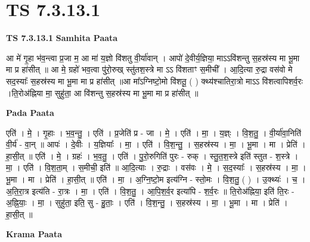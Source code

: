\documentclass[17pt]{extarticle}
\begin{document}
\section{ TS 7.3.13.1 }

\textbf{TS 7.3.13.1 } \newline
\textbf{Samhita Paata} \newline

आ मे॑ गृ॒हा भ॑व॒न्त्वा प्र॒जा म॒ आ मा॑ य॒ज्ञो वि॑शतु वी॒र्या॑वान् । आपो॑ दे॒वीर्य॒ज्ञिया॒ माऽऽवि॑शन्तु स॒हस्र॑स्य मा भू॒मा मा प्र हा॑सीत् ॥ आ मे॒ ग्रहो॑ भव॒त्वा पु॑रो॒रुख् स्तु॑तश॒स्त्रे मा ऽऽ वि॑शताꣳ स॒मीची᳚ । आ॒दि॒त्या रु॒द्रा वस॑वो मे सद॒स्याः᳚ स॒हस्र॑स्य मा भू॒मा मा प्र हा॑सीत् ॥आ मा᳚ऽग्निष्टो॒मो वि॑शतू॒ ( ) क्थ्य॑श्चातिरा॒त्रो माऽऽ वि॑शत्वापिशर्व॒रः ।ति॒रोअ॑ह्निया मा॒ सुहु॑ता॒ आ वि॑शन्तु स॒हस्र॑स्य मा भू॒मा मा प्र हा॑सीत् ॥ \newline

\textbf{Pada Paata} \newline

एति॑ । मे॒ । गृ॒हाः । भ॒व॒न्तु॒ । एति॑ । प्र॒जेति॑ प्र - जा । मे॒ । एति॑ । मा॒ । य॒ज्ञ्ः । वि॒श॒तु॒ । वी॒र्या॑वा॒निति॑ वी॒र्य॑ - वा॒न् ॥ आपः॑ । दे॒वीः । य॒ज्ञियाः᳚ । मा॒ । एति॑ । वि॒श॒न्तु॒ । स॒हस्र॑स्य । मा॒ । भू॒मा । मा । प्रेति॑ । हा॒सी॒त् ॥ एति॑ । मे॒ । ग्रहः॑ । भ॒व॒तु॒ । एति॑ । पु॒रो॒रुगिति॑ पुरः - रुक् । स्तु॒त॒श॒स्त्रे इति॑ स्तुत - श॒स्त्रे । मा॒ । एति॑ । वि॒श॒ता॒म् । स॒मीची॒ इति॑ ॥ आ॒दि॒त्याः । रु॒द्राः । वस॑वः । मे॒ । स॒द॒स्याः᳚ । स॒हस्र॑स्य । मा॒ । भू॒मा । मा । प्रेति॑ । हा॒सी॒त् ॥ एति॑ । मा॒ । अ॒ग्नि॒ष्टो॒म इत्य॑ग्नि - स्तो॒मः । वि॒श॒तु॒ ( ) । उ॒क्थ्यः॑ । च॒ । अ॒ति॒रा॒त्र इत्य॑ति - रा॒त्रः । मा॒ । एति॑ । वि॒श॒तु॒ । आ॒पि॒श॒र्व॒र इत्या॑पि - श॒र्व॒रः ॥ ति॒रो‌अ॑ह्निया॒ इति॑ ति॒रः - अ॒ह्नि॒याः॒ । मा॒ । सुहु॑ता॒ इति॒ सु - हु॒ताः॒ । एति॑ । वि॒श॒न्तु॒ । स॒हस्र॑स्य । मा॒ । भू॒मा । मा । प्रेति॑ । हा॒सी॒त् ॥  \newline


\textbf{Krama Paata} \newline
\end{document}
